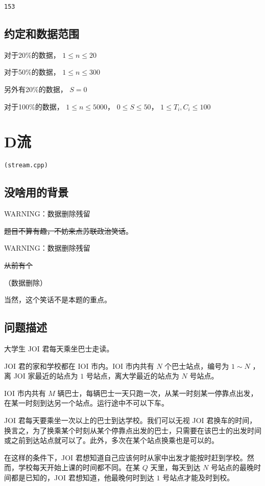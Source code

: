 \documentclass[UTF8]{ctexart}
\begin{document}
\begin{lstlisting}
153
\end{lstlisting}


\subsection{约定和数据范围}

对于20\%的数据， $1\le n\le 20$

对于50\%的数据， $1\le n\le 300$

另外有20\%的数据， $S=0$

对于100\%的数据， $1\le n\le 5000$， $0\le S\le 50$， $1\le T_i,C_i\le 100$

\newpage
\section{D流}
\begin{center}
\tt\large{(stream.cpp)}
\end{center}

\subsection{没啥用的背景}

WARNING：数据删除残留

\sout{题目不算有趣，不妨来点苏联政治笑话}。

WARNING：数据删除残留

\sout{从前有个}

（数据删除）

当然，这个笑话不是本题的重点。

\subsection{问题描述}

大学生 JOI 君每天乘坐巴士走读。

JOI 君的家和学校都在 IOI 市内。IOI 市内共有 $N$ 个巴士站点，编号为 $1\sim N$ ，离 JOI 家最近的站点为 $1$ 号站点，离大学最近的站点为 $N$ 号站点。

IOI 市内共有 $M$ 辆巴士，每辆巴士一天只跑一次，从某一时刻某一停靠点出发，在某一时刻到达另一个站点。运行途中不可以下车。

JOI 君每天要乘坐一次以上的巴士到达学校。我们可以无视 JOI 君换车的时间，换言之，为了换乘某个时刻从某个停靠点出发的巴士，只需要在该巴士的出发时间或之前到达站点就可以了。此外，多次在某个站点换乘也是可以的。

在这样的条件下，JOI 君想知道自己应该何时从家中出发才能按时赶到学校。然而，学校每天开始上课的时间都不同。在某 $Q$ 天里，每天到达 $N$ 号站点的最晚时间都是已知的，JOI 君想知道，他最晚何时到达 $1$ 号站点才能及时到校。
\end{document}
